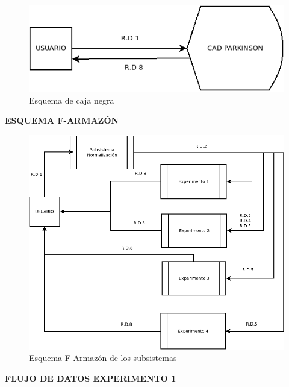 \begin{figure}[H] %
	\centering
	\includegraphics[scale=0.7]{esquema-cajanegra.png}  %
	\caption{Esquema de caja negra} 
	\label{fig:caja-negra}
\end{figure}
\newpage
\textbf{ESQUEMA F-ARMAZÓN}

\begin{figure}[H] %
	\centering
	\includegraphics[scale=0.45]{esquema-f-armazon.png}  %
	\caption{Esquema F-Armazón de los subsistemas} 
	\label{fig:f-armazon}
\end{figure}

\vspace{0.1cm}
\textbf{FLUJO DE DATOS EXPERIMENTO 1}


